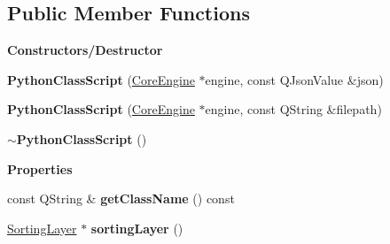 \subsection*{Public Member Functions}
\begin{Indent}\textbf{ Constructors/\+Destructor}\par
\begin{DoxyCompactItemize}
\item 
\mbox{\label{classrev_1_1_python_class_script_ad19a7af19c75a2348cb96c4a821309f1}} 
{\bfseries Python\+Class\+Script} (\mbox{\hyperlink{classrev_1_1_core_engine}{Core\+Engine}} $\ast$engine, const Q\+Json\+Value \&json)
\item 
\mbox{\label{classrev_1_1_python_class_script_ae607f34766e87374949e9b2848ca4e56}} 
{\bfseries Python\+Class\+Script} (\mbox{\hyperlink{classrev_1_1_core_engine}{Core\+Engine}} $\ast$engine, const Q\+String \&filepath)
\item 
\mbox{\label{classrev_1_1_python_class_script_a58e5c8afb7c24702d5f890155a67f482}} 
{\bfseries $\sim$\+Python\+Class\+Script} ()
\end{DoxyCompactItemize}
\end{Indent}
\begin{Indent}\textbf{ Properties}\par
\begin{DoxyCompactItemize}
\item 
\mbox{\label{classrev_1_1_python_class_script_af0ddb9be19c94f32e48c0e94ebe282eb}} 
const Q\+String \& {\bfseries get\+Class\+Name} () const
\item 
\mbox{\label{classrev_1_1_python_class_script_a4133f884de411117c61e08683fbef3cb}} 
\mbox{\hyperlink{structrev_1_1_sorting_layer}{Sorting\+Layer}} $\ast$ {\bfseries sorting\+Layer} ()
\end{DoxyCompactItemize}
\end{Indent}
